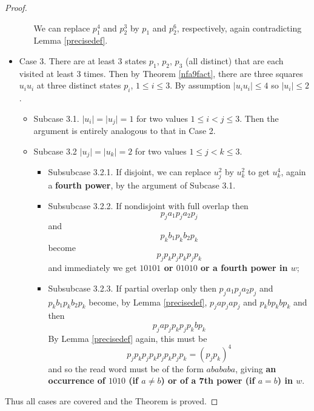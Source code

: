 \documentclass[12pt]{article}
\newcommand{\abs}[1]{\lvert#1\rvert}
\theoremstyle{plain}
\theoremstyle{definition}
\theoremstyle{remark}
\begin{document}
\begin{proof}
\begin{itemize}
\begin{itemize}
								We can replace $p_1^4$ and $p_2^3$ by $p_1$ and $p_2^6$, respectively,
								again contradicting Lemma \ref{precisedef}.
						\end{itemize}
						\item{}
						Case 3. There are at least 3 states $p_1$, $p_2$, $p_3$ (all distinct) that are each visited at least 3 times.
						Then by Theorem \ref{nfa9fact}, there are three squares ${u_i}{u_i}$ at three distinct states $p_i$, $1\le i\le 3$.
						By assumption $\abs{{u_i}{u_i}}\le 4$ so $\abs{u_i}\le 2$.
						\begin{itemize}
							\item{}
								Subcase 3.1. $\abs{u_i}=\abs{u_j}=1$ for two values $1\le i< j\le 3$.
								Then the argument is entirely analogous to that in Case 2.
							\item{} Subcase 3.2
								$\abs{u_j}=\abs{u_k}=2$ for two values $1\le j < k\le 3$.
						\begin{itemize}
							\item{} Subsubcase 3.2.1.
								If disjoint, we can replace $u_j^2$ by $u_k^2$ to get $u_k^4$, again a \textbf{fourth power},
								by the argument of Subcase 3.1.
							\item{} Subsubcase 3.2.2.
								If nondisjoint with full overlap then
								\[
									{p_j}{a_1}{p_j}{a_2}{p_j}
								\]
								and
								\[
									{p_k}{b_1}{p_k}{b_2}{p_k}
								\]
								become
								\[
									{p_j}{p_k}{p_j}{p_k}{p_j}{p_k}
								\]
								and
								immediately we get \textbf{$10101$ or $01010$ or a fourth power in $w$};
							\item{} Subsubcase 3.2.3.
								If partial overlap only then ${p_j}{a_1}{p_j}{a_2}{p_j}$ and ${p_k}{b_1}{p_k}{b_2}{p_k}$ become,
								by Lemma \ref{precisedef},
								${p_j}a {p_j}a {p_j}$ and ${p_k}b {p_k}b {p_k}$ and then
								\[
									{p_j} a {p_j}{p_k}{p_j}{p_k} b {p_k}
								\]
								By Lemma \ref{precisedef} again, this must be
								\[
									{p_j}{p_k} {p_j}{p_k} {p_j}{p_k} {p_j}{p_k} = {({p_j}{p_k})}^4
								\]
								and so the read word must be of the form $abababa$,
								giving \textbf{an occurrence of $1010$ (if $a\ne b$) or of a 7th power (if $a=b$) in $w$}.
						\end{itemize}
					\end{itemize}
				\end{itemize}
				Thus all cases are covered and the Theorem is proved.
			\end{proof}
\end{document}
